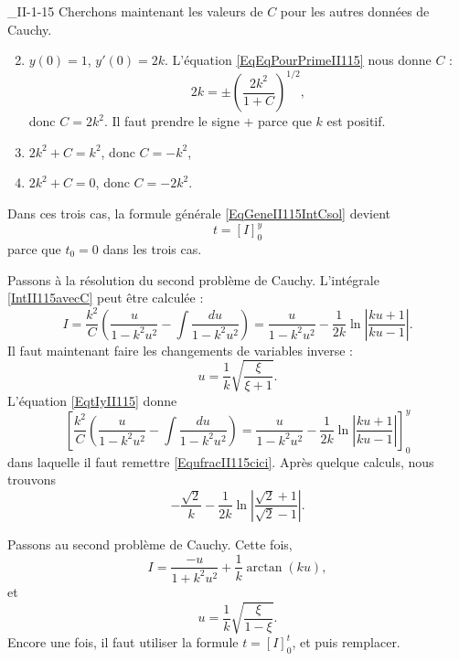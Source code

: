 \begin{corrige}{_II-1-15}
Cherchons maintenant les valeurs de $C$ pour les autres données de Cauchy.
\begin{enumerate}
\setcounter{enumi}{1}

\item
$y(0)=1$, $y'(0)=2k$.
L'équation \eqref{EqEqPourPrimeII115} nous donne $C$ :
\begin{equation}
	2k=\pm\left( \frac{ 2k^2 }{ 1+C } \right)^{1/2},
\end{equation}
donc $C=2k^2$. Il faut prendre le signe $+$ parce que $k$ est positif.

\item
$2k^2+C=k^2$, donc $C=-k^2$,
\item
$2k^2+C=0$, donc $C=-2k^2$.

\end{enumerate}
Dans ces trois cas, la formule générale \eqref{EqGeneII115IntCsol} devient
\begin{equation}		\label{EqtIyII115}
	t=[I]_0^y
\end{equation}
parce que $t_0=0$ dans les trois cas.

Passons à la résolution du second problème de Cauchy. L'intégrale \eqref{IntII115avecC} peut être calculée :
\begin{equation}
	I=\frac{ k^2 }{ C }\left( \frac{ u }{ 1-k^2u^2 }  -\int\frac{ du }{ 1-k^2u^2 } \right)=\frac{ u }{ 1-k^2u^2 }-\frac{1}{ 2k }\ln\left| \frac{ ku+1 }{ ku-1 } \right|.
\end{equation}
Il faut maintenant faire les changements de variables  inverse :
\begin{equation}		\label{EqufracII115cici}
	u=\frac{1}{ k }\sqrt{\frac{ \xi }{ \xi+1 }}.
\end{equation}
L'équation \eqref{EqtIyII115} donne
\begin{equation}
	\left[\frac{ k^2 }{ C }\left( \frac{ u }{ 1-k^2u^2 }  -\int\frac{ du }{ 1-k^2u^2 } \right)=\frac{ u }{ 1-k^2u^2 }-\frac{1}{ 2k }\ln\left| \frac{ ku+1 }{ ku-1 } \right|\right]_0^y
\end{equation}
dans laquelle il faut remettre \eqref{EqufracII115cici}. Après quelque calculs, nous trouvons
\begin{equation}
	-\frac{ \sqrt{2} }{ k }-\frac{1}{ 2k }\ln\left| \frac{ \sqrt{2}+1 }{ \sqrt{2}-1 } \right|.
\end{equation}

Passons au second problème de Cauchy. Cette fois,
\begin{equation}
	I=\frac{ -u }{ 1+k^2u^2 }+\frac{1}{ k }\arctan(ku),
\end{equation}
et 
\begin{equation}
	u=\frac{1}{ k }\sqrt{\frac{ \xi }{ 1-\xi }}.
\end{equation}
Encore une fois, il faut utiliser la formule $t=[I]_0^t$, et puis remplacer.



\end{corrige}

